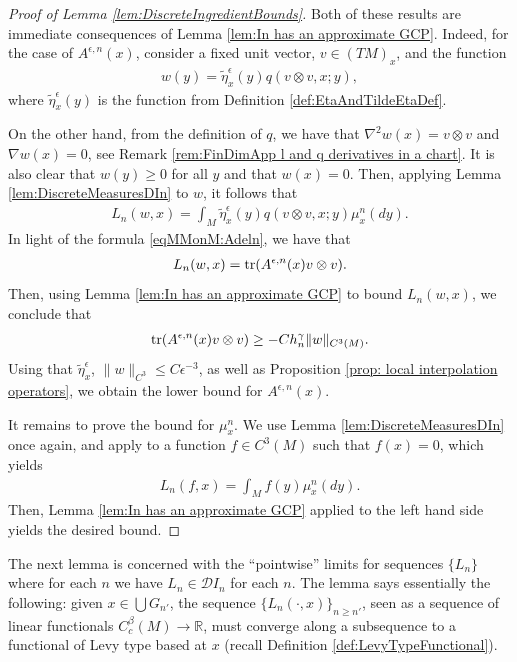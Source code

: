 \documentclass[11pt,reqno]{amsart}
\numberwithin{equation}{section}
\theoremstyle{plain}
\def\D{\mathcal D}
\def\grad{\nabla}
\def\Tr{\textnormal{tr}}
\newcommand{\norm}[1]{\lVert#1\rVert}
\begin{document}
\begin{proof}[Proof of Lemma \ref{lem:DiscreteIngredientBounds}]
  Both of these results are immediate consequences of Lemma \ref{lem:In has an approximate GCP}.  Indeed, for the case of $A^{\epsilon,n}(x)$, consider a fixed unit vector, $v\in (TM)_x$, and the function
  \begin{align*}
    w(y)=\tilde\eta^\epsilon_x(y)q(v\otimes v,x;y),
  \end{align*}		
  where $\tilde \eta^\epsilon_x(y)$ is the function from Definition \ref{def:EtaAndTildeEtaDef}.		
		
  On the other hand, from the definition of $q$, we have that $\grad^2w(x)=v\otimes v$ and $\grad w(x)=0$, see Remark \ref{rem:FinDimApp l and q derivatives in a chart}.  It is also clear that  $w(y)\geq0$ for all $y$ and that $w(x)=0$. Then, applying Lemma \ref{lem:DiscreteMeasuresDIn} to $w$,  it follows that 
  \begin{align*}
    L_n(w,x) =\int_{M} \tilde\eta^\epsilon_x(y)q(v\otimes v,x;y) \mu^n_x(dy).
  \end{align*}
  In light of the formula \eqref{eqMMonM:Adeln}, we have that
  \begin{align*}
    L_n(w,x) = \Tr(A^{\epsilon,n}(x) v\otimes v).
  \end{align*}
  Then, using Lemma \ref{lem:In has an approximate GCP} to bound $L_n(w,x)$, we conclude that
  \begin{align*}
     \Tr(A^{\epsilon,n}(x) v\otimes v) \geq -Ch_n^\gamma \|w\|_{C^3(M)}.
  \end{align*}
  Using that $\tilde\eta^\epsilon_x$, $\norm{w}_{C^3}\leq C\epsilon^{-3}$, as well as Proposition \ref{prop: local interpolation operators}, we obtain the lower bound for $A^{\epsilon,n}(x)$.
  
  It remains to prove the bound for $\mu^n_x$. We use Lemma \ref{lem:DiscreteMeasuresDIn} once again, and apply to a function $f\in C^3(M)$ such that $f(x)=0$, which yields
  \begin{align*}
    L_n(f,x) = \int_{M} f(y)\mu^n_x(dy).
  \end{align*}
  Then, Lemma \ref{lem:In has an approximate GCP} applied to the left hand side yields the desired bound.
\end{proof}

The next lemma is concerned with the ``pointwise'' limits for sequences $\{L_n\}$ where for each $n$ we have $L_n \in \D I_n$ for each $n$. The lemma says essentially the following: given $x \in \bigcup G_{n'}$, the sequence $\{L_n(\cdot,x)\}_{n\geq n'}$, seen as a sequence of linear functionals $C^\beta_c(M) \to \mathbb{R}$, must converge along a subsequence to a functional of Levy type based at $x$ (recall Definition \ref{def:LevyTypeFunctional}).
\end{document}
